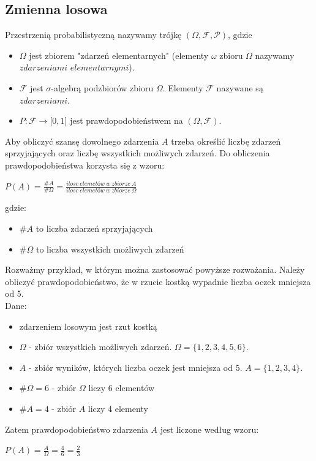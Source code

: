 \subsection{Zmienna losowa}

\begin{definicja}
	Przestrzenią probabilistyczną nazywamy trójkę  $(\Omega, \mathcal{F}, \mathcal{P})$, gdzie
	\begin{itemize}
		\item $\Omega$ jest zbiorem "zdarzeń elementarnych" (elementy $\omega$ zbioru $\Omega$ nazywamy $\textit{zdarzeniami elementarnymi}$).
		\item $\mathcal{F}$ jest $\sigma$-algebrą podzbiorów zbioru $\Omega$. Elementy $\mathcal{F}$ nazywane są $\textit{zdarzeniami}$.
		\item $P: \mathcal{F} \rightarrow \lbrack 0, 1 \rbrack$ jest prawdopodobieństwem na $(\Omega, \mathcal{F})$.
	\end{itemize}
\end{definicja}

\begin{przyklad}
	Aby obliczyć szansę dowolnego zdarzenia $A$ trzeba określić liczbę zdarzeń sprzyjających oraz liczbę wszystkich możliwych zdarzeń. Do obliczenia prawdopodobieństwa korzysta się z wzoru:
	\begin{center}
		$ P (A) = \frac{\#A}{\#\Omega} = \frac{ ilosc \ elemetów \ w \ zbiorze \ A }{ilosc \ elemetów \ w \ zbiorze \ \Omega} $
	\end{center}
	gdzie:
	\begin{itemize}
		\item $\#A$ to liczba zdarzeń sprzyjających
		\item $\#\Omega$ to liczba wszystkich możliwych zdarzeń
	\end{itemize}
	Rozważmy przykład, w którym można zastosować powyższe rozważania. 
	Należy obliczyć prawdopodobieństwo, że w rzucie kostką wypadnie liczba oczek mniejsza od 5. \\
	Dane:
	\begin{itemize}
		\item zdarzeniem losowym jest rzut kostką
		\item $\Omega$ - zbiór wszystkich możliwych zdarzeń. $\Omega = \{1, 2, 3, 4, 5, 6\}$.
		\item $A$ - zbiór wyników, których liczba oczek jest mniejsza od 5. $A = \{1, 2, 3, 4\}$.
		\item $\#\Omega = 6$ - zbiór $\Omega$ liczy 6 elementów
		\item $\#A = 4$ - zbiór $A$ liczy 4 elementy
	\end{itemize}
	Zatem prawdopodobieństwo zdarzenia $A$ jest liczone według wzoru:
	\begin{center}
		$P(A) = \frac{A}{\Omega} = \frac{4}{6} = \frac{2}{3}$
	\end{center}
	
\end{przyklad}

